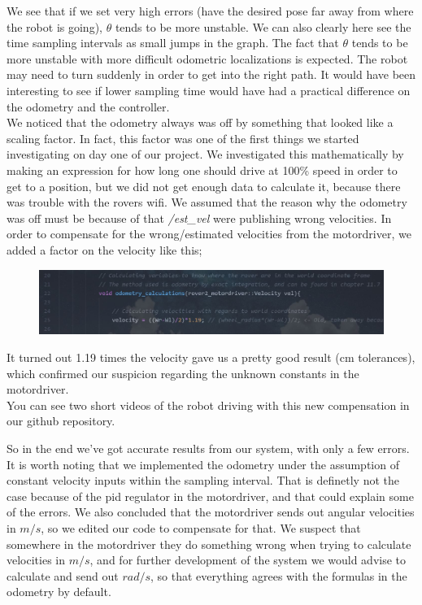 \documentclass[a4paper,10pt]{article}
\begin{document}
		We see that if we set very high errors (have the desired pose far away from where the robot is going), $\theta$ tends to be more unstable. We can also clearly here see the time sampling
		intervals as small jumps in the graph. The fact that $\theta$ tends to be more unstable with more difficult odometric localizations is expected. The robot may need to turn suddenly in order
		to get into the right path. It would have been interesting to see if lower sampling time would have had a practical difference on the odometry and the controller.\\
		We noticed that the odometry always was off by something that looked like a scaling factor. In fact, this factor was one of the first things we started investigating on day one of our project.
		We investigated this mathematically by making an expression for how long one should drive at 100\% speed in order to get to a position, but we did not get enough data to calculate it, because
		there was trouble with the rovers wifi. We assumed that the reason why the odometry was off must be because of that \textit{/est\_vel} were publishing wrong velocities. In order to
		compensate for the wrong/estimated velocities from the motordriver, we added a factor on the velocity like this;

		\begin{figure}[H]
		\centering
		\includegraphics[width=1.1\textwidth]{snippet_adjustment_factor.JPG}
		\end{figure}
		It turned out 1.19 times the velocity gave us a pretty good result (cm tolerances), which confirmed our suspicion regarding the unknown constants in the motordriver.\\
		You can see two short videos of the robot driving with this new compensation in our github repository.


		So in the end we've got accurate results from our system, with only a few errors. It is worth noting that we implemented the odometry under the assumption of constant velocity inputs within the sampling
		interval. That is definetly not the case because of the pid regulator in the motordriver, and that could explain some of the errors. We also concluded that the motordriver sends
		out angular velocities in $m/s$, so we edited our code to compensate for that. We suspect that somewhere in the motordriver they do something wrong when trying to calculate velocities in
		$m/s$, and for further development of the system we would advise to calculate and send out $rad/s$, so that everything agrees with the formulas in the odometry by default.
\end{document}
